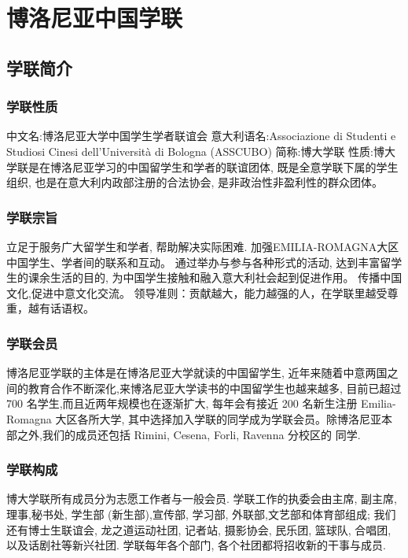 \chapter{博洛尼亚中国学联}              

\section{学联简介}

\subsection{学联性质}
中文名:博洛尼亚大学中国学生学者联谊会 
意大利语名:Associazione di Studenti e Studiosi Cinesi dell'Università di Bologna (ASSCUBO)
简称:博大学联
性质:博大学联是在博洛尼亚学习的中国留学生和学者的联谊团体, 既是全意学联下属的学生组织, 也是在意大利内政部注册的合法协会, 是非政治性非盈利性的群众团体。 

\subsection{学联宗旨}
立足于服务广大留学生和学者, 帮助解决实际困难. 
加强EMILIA-ROMAGNA大区中国学生、学者间的联系和互动。 
通过举办与参与各种形式的活动, 达到丰富留学生的课余生活的目的, 为中国学生接触和融入意大利社会起到促进作用。 
 传播中国文化,促进中意文化交流。 领导准则：贡献越大，能力越强的人，在学联里越受尊重，越有话语权。

\subsection{学联会员}
博洛尼亚学联的主体是在博洛尼亚大学就读的中国留学生, 近年来随着中意两国之间的教育合作不断深化,来博洛尼亚大学读书的中国留学生也越来越多, 目前已超过 700 名学生,而且近两年规模也在逐渐扩大, 每年会有接近 200 名新生注册 Emilia-Romagna 大区各所大学, 其中选择加入学联的同学成为学联会员。除博洛尼亚本部之外,我们的成员还包括 Rimini, Cesena, Forli, Ravenna 分校区的 同学. 

\subsection{学联构成}
博大学联所有成员分为志愿工作者与一般会员. 学联工作的执委会由主席, 副主席,理事,秘书处, 学生部 (新生部),宣传部, 学习部, 外联部,文艺部和体育部组成; 我们还有博士生联谊会, 龙之道运动社团, 记者站, 摄影协会, 民乐团, 篮球队, 合唱团, 以及话剧社等新兴社团. 学联每年各个部门, 各个社团都将招收新的干事与成员. 

